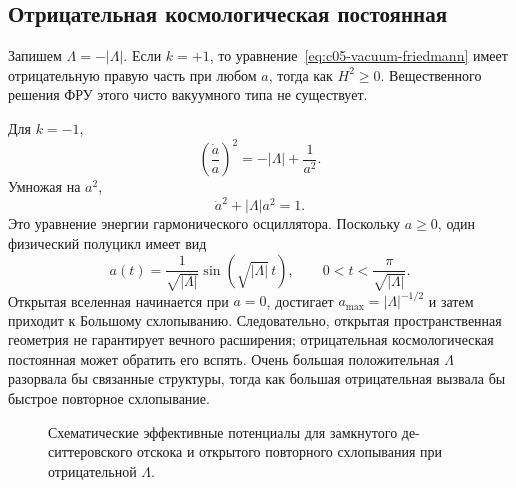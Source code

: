 \subsection{Отрицательная космологическая постоянная}

Запишем \(\Lambda=-|\Lambda|\). Если \(k=+1\), то уравнение~\eqref{eq:c05-vacuum-friedmann} имеет отрицательную правую часть при любом \(a\), тогда как \(H^2\geq0\). Вещественного решения ФРУ этого чисто вакуумного типа не существует.

Для \(k=-1\),
\begin{equation}
\left(\frac{\dot a}{a}\right)^2=-|\Lambda|+\frac{1}{a^2}.
\end{equation}
Умножая на \(a^2\),
\begin{equation}
\dot a^2+|\Lambda|a^2=1.
\label{eq:c05-negative-lambda-oscillator}
\end{equation}
Это уравнение энергии гармонического осциллятора. Поскольку \(a\geq0\), один физический полуцикл имеет вид
\begin{equation}
a(t)=\frac{1}{\sqrt{|\Lambda|}}
\sin\!\left(\sqrt{|\Lambda|}\,t\right),
\qquad
0<t<\frac{\pi}{\sqrt{|\Lambda|}}.
\end{equation}
Открытая вселенная начинается при \(a=0\), достигает \(a_{\max}=|\Lambda|^{-1/2}\) и затем приходит к Большому схлопыванию. Следовательно, открытая пространственная геометрия не гарантирует вечного расширения; отрицательная космологическая постоянная может обратить его вспять. Очень большая положительная \(\Lambda\) разорвала бы связанные структуры, тогда как большая отрицательная вызвала бы быстрое повторное схлопывание.

\begin{figure}[htbp]
\centering
{}
\hspace{2em}
\caption{Схематические эффективные потенциалы для замкнутого де-ситтеровского отскока и открытого повторного схлопывания при отрицательной \(\Lambda\).}
\label{fig:c05-mechanical-potentials}
\end{figure}

